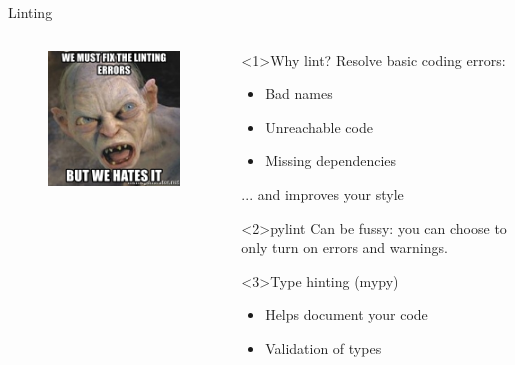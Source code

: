 \documentclass[t]{beamer}
\begin{document}
\begin{frame}{Linting}
    \begin{columns}
        \begin{column}{0.5\textwidth}
            \begin{figure}
                \centering
                \includegraphics[width=\linewidth]{figures/linting.jpg}
            \end{figure}
        \end{column}
        \begin{column}{0.5\textwidth}
            \begin{block}<1>{Why lint?}
                Resolve basic coding errors:
                \begin{itemize}
                    \item Bad names
                    \item Unreachable code
                    \item Missing dependencies
                \end{itemize}
                ... and improves your style
            \end{block}
            \begin{block}<2>{pylint}
                Can be fussy: you can choose to only turn on errors and warnings.
            \end{block}

            \begin{block}<3>{Type hinting (mypy)}
                \begin{itemize}
                    \item Helps document your code
                    \item Validation of types
                \end{itemize}
            \end{block}
        \end{column}
    \end{columns}
\end{frame}
\end{document}

